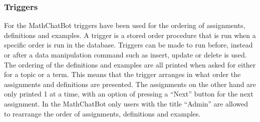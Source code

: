 \subsubsection{Triggers}
For the MathChatBot triggers have been used for the ordering of assignments, definitions and examples. A trigger is a stored order procedure that is run when a specific order is run in the database. Triggers can be made to run before, instead or after a data manipulation command such as insert, update or delete is used. The ordering of the definitions and examples are all printed when asked for either for a topic or a term. This means that the trigger arranges in what order the assignments and definitions are presented. The assignments on the other hand are only printed 1 at a time, with an option of pressing a \enquote{Next} button for the next assignment. In the MathChatBot only users with the title \enquote{Admin} are allowed to rearrange the order of assignments, definitions and examples.


